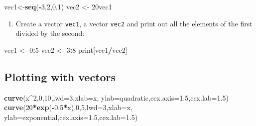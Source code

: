 \documentclass[
]{book}
\newenvironment{Shaded}{\begin{snugshade}}{\end{snugshade}}
\newcommand{\DataTypeTok}[1]{\textcolor[rgb]{0.13,0.29,0.53}{#1}}
\newcommand{\DecValTok}[1]{\textcolor[rgb]{0.00,0.00,0.81}{#1}}
\newcommand{\FloatTok}[1]{\textcolor[rgb]{0.00,0.00,0.81}{#1}}
\newcommand{\KeywordTok}[1]{\textcolor[rgb]{0.13,0.29,0.53}{\textbf{#1}}}
\newcommand{\NormalTok}[1]{#1}
\newcommand{\OperatorTok}[1]{\textcolor[rgb]{0.81,0.36,0.00}{\textbf{#1}}}
\newcommand{\StringTok}[1]{\textcolor[rgb]{0.31,0.60,0.02}{#1}}
\providecommand{\tightlist}{%
  \setlength{\itemsep}{0pt}\setlength{\parskip}{0pt}}
\begin{document}
\begin{Shaded}
\begin{Highlighting}[]
\NormalTok{vec1\textless{}{-}}\KeywordTok{seq}\NormalTok{(}\OperatorTok{{-}}\DecValTok{3}\NormalTok{,}\DecValTok{2}\NormalTok{,}\FloatTok{0.1}\NormalTok{)}
\NormalTok{vec2 \textless{}{-}}\StringTok{ }\NormalTok{20vec1}
\end{Highlighting}
\end{Shaded}

\begin{enumerate}
\def\labelenumi{\arabic{enumi}.}
\setcounter{enumi}{6}
\tightlist
\item
  Create a vector \texttt{vec1}, a vector \texttt{vec2} and print out all the elements of the first divided by the second:
\end{enumerate}

\begin{Shaded}
\begin{Highlighting}[]
\NormalTok{vec1 \textless{}{-}}\StringTok{ }\DecValTok{0}\OperatorTok{:}\DecValTok{5}
\NormalTok{vec2 \textless{}{-}}\StringTok{ }\DecValTok{3}\OperatorTok{:}\DecValTok{8}
\NormalTok{print[vec1}\OperatorTok{/}\NormalTok{vec2]}
\end{Highlighting}
\end{Shaded}

\hypertarget{plotting-with-vectors}{%
\subsection{Plotting with vectors}\label{plotting-with-vectors}}

\begin{Shaded}
\begin{Highlighting}[]
\KeywordTok{curve}\NormalTok{(x}\OperatorTok{\^{}}\DecValTok{2}\NormalTok{,}\DecValTok{0}\NormalTok{,}\DecValTok{10}\NormalTok{,}\DataTypeTok{lwd=}\DecValTok{3}\NormalTok{,}\DataTypeTok{xlab=}\StringTok{\textquotesingle{}x\textquotesingle{}}\NormalTok{, }\DataTypeTok{ylab=}\StringTok{\textquotesingle{}quadratic\textquotesingle{}}\NormalTok{,}\DataTypeTok{cex.axis=}\FloatTok{1.5}\NormalTok{,}\DataTypeTok{cex.lab=}\FloatTok{1.5}\NormalTok{)}
\KeywordTok{curve}\NormalTok{(}\DecValTok{20}\OperatorTok{*}\KeywordTok{exp}\NormalTok{(}\OperatorTok{{-}}\FloatTok{0.5}\OperatorTok{*}\NormalTok{x),}\DecValTok{0}\NormalTok{,}\DecValTok{5}\NormalTok{,}\DataTypeTok{lwd=}\DecValTok{3}\NormalTok{,}\DataTypeTok{xlab=}\StringTok{\textquotesingle{}x\textquotesingle{}}\NormalTok{, }\DataTypeTok{ylab=}\StringTok{\textquotesingle{}exponential\textquotesingle{}}\NormalTok{,}\DataTypeTok{cex.axis=}\FloatTok{1.5}\NormalTok{,}\DataTypeTok{cex.lab=}\FloatTok{1.5}\NormalTok{)}
\end{Highlighting}
\end{Shaded}
\end{document}
